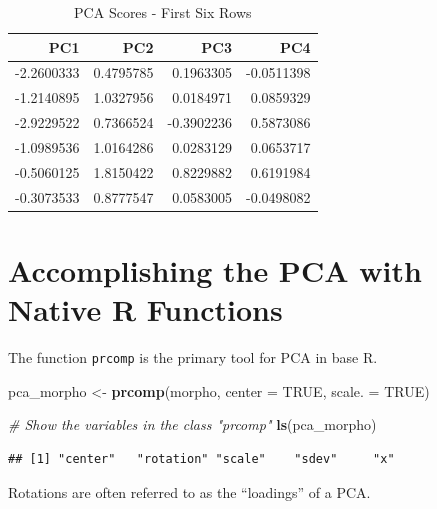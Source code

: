 \documentclass[]{article}
\newenvironment{Shaded}{\begin{snugshade}}{\end{snugshade}}
\newcommand{\CommentTok}[1]{\textcolor[rgb]{0.56,0.35,0.01}{\textit{#1}}}
\newcommand{\DataTypeTok}[1]{\textcolor[rgb]{0.13,0.29,0.53}{#1}}
\newcommand{\KeywordTok}[1]{\textcolor[rgb]{0.13,0.29,0.53}{\textbf{#1}}}
\newcommand{\NormalTok}[1]{#1}
\newcommand{\OperatorTok}[1]{\textcolor[rgb]{0.81,0.36,0.00}{\textbf{#1}}}
\newcommand{\OtherTok}[1]{\textcolor[rgb]{0.56,0.35,0.01}{#1}}
\newcommand{\StringTok}[1]{\textcolor[rgb]{0.31,0.60,0.02}{#1}}
\begin{document}
\begin{table}[t]

\caption{\label{tab:unnamed-chunk-11}PCA Scores - First Six Rows}
\centering
\begin{tabular}{r|r|r|r}
\hline
PC1 & PC2 & PC3 & PC4\\
\hline
-2.2600333 & 0.4795785 & 0.1963305 & -0.0511398\\
\hline
-1.2140895 & 1.0327956 & 0.0184971 & 0.0859329\\
\hline
-2.9229522 & 0.7366524 & -0.3902236 & 0.5873086\\
\hline
-1.0989536 & 1.0164286 & 0.0283129 & 0.0653717\\
\hline
-0.5060125 & 1.8150422 & 0.8229882 & 0.6191984\\
\hline
-0.3073533 & 0.8777547 & 0.0583005 & -0.0498082\\
\hline
\end{tabular}
\end{table}

\hypertarget{accomplishing-the-pca-with-native-r-functions}{%
\section{Accomplishing the PCA with Native R
Functions}\label{accomplishing-the-pca-with-native-r-functions}}

The function \texttt{prcomp} is the primary tool for PCA in base R.

\begin{Shaded}
\begin{Highlighting}[]
\NormalTok{pca_morpho <-}\StringTok{ }\KeywordTok{prcomp}\NormalTok{(morpho, }\DataTypeTok{center =} \OtherTok{TRUE}\NormalTok{, }\DataTypeTok{scale. =} \OtherTok{TRUE}\NormalTok{)}

\CommentTok{# Show the variables in the class "prcomp"}
\KeywordTok{ls}\NormalTok{(pca_morpho)}
\end{Highlighting}
\end{Shaded}

\begin{verbatim}
## [1] "center"   "rotation" "scale"    "sdev"     "x"
\end{verbatim}

Rotations are often referred to as the ``loadings'' of a PCA.

\begin{Shaded}
\end{Shaded}
\end{document}
